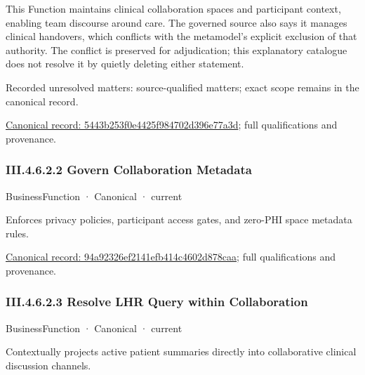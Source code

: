 This Function maintains clinical collaboration spaces and participant context, enabling team discourse around care. The governed source also says it manages clinical handovers, which conflicts with the metamodel's explicit exclusion of that authority. The conflict is preserved for adjudication; this explanatory catalogue does not resolve it by quietly deleting either statement.


{\small Recorded unresolved matters: source-qualified matters; exact scope remains in the canonical record.}\par
{\footnotesize \href{../../../../continuum/business/business-function/5443b253f0e4425f984702d396e77a3d.md}{Canonical record: 5443b253f0e4425f984702d396e77a3d}; full qualifications and provenance.}\par
\subsubsection*{III.4.6.2.2 Govern Collaboration Metadata}
\label{navigation:III.4.6.2.2}

\label{element:94a92326ef2141efb414c4602d878caa}
{\small BusinessFunction · Canonical · current}\par

Enforces privacy policies, participant access gates, and zero-PHI space metadata rules.


{\footnotesize \href{../../../../continuum/business/business-function/94a92326ef2141efb414c4602d878caa.md}{Canonical record: 94a92326ef2141efb414c4602d878caa}; full qualifications and provenance.}\par
\subsubsection*{III.4.6.2.3 Resolve LHR Query within Collaboration}
\label{navigation:III.4.6.2.3}

\label{element:1d4ac561d963484480e6b06a09416616}
{\small BusinessFunction · Canonical · current}\par

Contextually projects active patient summaries directly into collaborative clinical discussion channels.


